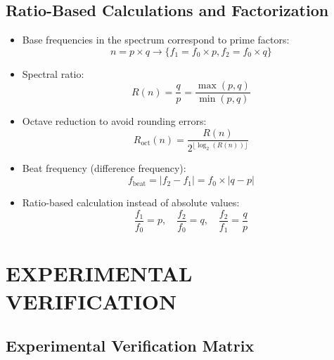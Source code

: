 \documentclass[12pt,a4paper]{article}
\begin{document}
	\subsection{Ratio-Based Calculations and Factorization}
	\begin{itemize}
		\item Base frequencies in the spectrum correspond to prime factors:
		\begin{equation}
			n = p \times q \rightarrow \{f_1 = f_0 \times p, f_2 = f_0 \times q\}
		\end{equation}
		
		\item Spectral ratio:
		\begin{equation}
			R(n) = \frac{q}{p} = \frac{\max(p,q)}{\min(p,q)}
		\end{equation}
		
		\item Octave reduction to avoid rounding errors:
		\begin{equation}
			R_{\text{oct}}(n) = \frac{R(n)}{2^{\lfloor\log_2(R(n))\rfloor}}
		\end{equation}
		
		\item Beat frequency (difference frequency):
		\begin{equation}
			f_{\text{beat}} = |f_2 - f_1| = f_0 \times |q - p|
		\end{equation}
		
		\item Ratio-based calculation instead of absolute values:
		\begin{equation}
			\frac{f_1}{f_0} = p, \quad \frac{f_2}{f_0} = q, \quad \frac{f_2}{f_1} = \frac{q}{p}
		\end{equation}
	\end{itemize}
	
	\section{EXPERIMENTAL VERIFICATION}
	
	\subsection{Experimental Verification Matrix}
	
\end{document}
